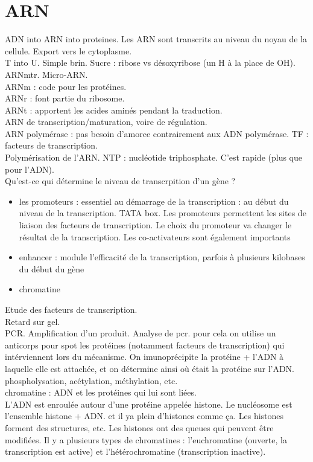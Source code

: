 \documentclass[10pt,a4paper]{article}
\begin{document}
\section{ARN}
ADN into ARN into proteines. Les ARN sont transcrits au niveau du noyau de la cellule. Export vers le cytoplasme.\\
T into U. Simple brin. Sucre : ribose vs désoxyribose (un H à la place de OH). ARNmtr. Micro-ARN.\\
ARNm : code pour les protéines.\\
ARNr : font partie du ribosome.\\
ARNt : apportent les acides aminés pendant la traduction.\\
ARN de transcription/maturation, voire de régulation.\\
ARN polymérase : pas besoin d'amorce contrairement aux ADN polymérase. TF : facteurs de transcription.\\
Polymérisation de l'ARN. NTP : nucléotide triphosphate. C'est rapide (plus que pour l'ADN).\\
Qu'est-ce qui détermine le niveau de transcrpition d'un gène ? \\
\begin{itemize}
  \item les promoteurs : essentiel au démarrage de la transcription : au début du niveau de la transcription. TATA box. Les promoteurs permettent les sites de liaison des facteurs de transcription. Le choix du promoteur va changer le résultat de la transcription. Les co-activateurs sont également importants\\
  \item enhancer : module l'efficacité de la transcription, parfois à plusieurs kilobases du début du gène
  \item chromatine
\end{itemize}
Etude des facteurs de transcription. \\
Retard sur gel. \\
PCR. Amplification d'un produit. Analyse de pcr. pour cela on utilise un anticorps pour spot les protéines (notamment facteurs de transcription) qui intérviennent lors du mécanisme. On imunoprécipite la protéine + l'ADN à laquelle elle est attachée, et on détermine ainsi où était la protéine sur l'ADN. \\
phospholysation, acétylation, méthylation, etc.\\
chromatine : ADN et les protéines qui lui sont liées.\\
L'ADN est enroulée autour d'une protéine appelée histone. Le nucléosome est l'ensemble histone + ADN. et il ya  plein d'histones comme ça. Les histones forment des structures, etc. Les histones ont des queues qui peuvent être modifiées. Il y a plusieurs types de chromatines : l'euchromatine (ouverte, la transcription est active) et l'hétérochromatine (transcription inactive).\\
\end{document}
